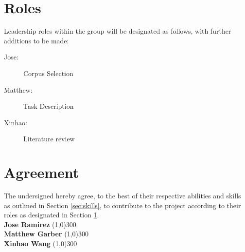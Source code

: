 \documentclass{article}
\newcommand{\groupmember}[1]{#1}
\newcommand{\role}[1]{#1}
\newcommand{\sigline}[2]{\vspace{2em} #1 \hfill \line(1,0){#2}}
\begin{document}
\section{Roles} %
\label{sec:roles}

Leadership roles within the group will be designated as follows, with further additions to be made:

\begin{description}
    \item[\role{Jose}:] Corpus Selection
    \item[\role{Matthew}:] Task Description
    \item[\role{Xinhao}:] Literature review
\end{description}

\section{Agreement} %
\label{par:agreement}
The undersigned hereby agree, to the best of their respective abilities and skills as outlined in Section \ref{sec:skills}, to contribute to the project according to their roles as designated in Section \ref{sec:roles}.%
\vspace{2em}\\
\sigline{\textbf{\groupmember{Jose Ramirez}}}{300}\\
\sigline{\textbf{\groupmember{Matthew Garber}}}{300}\\
\sigline{\textbf{\groupmember{Xinhao Wang}}}{300}\\
\end{document}
